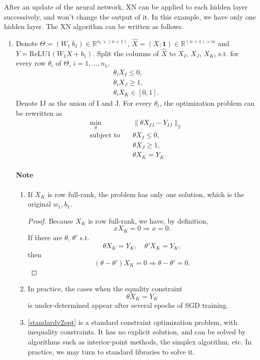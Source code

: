 After an update of the neural network, XN can be applied to each hidden layer successively, and won't change the output of it. In this example, we have only one hidden layer. The XN algorithm can be written as follows.
\begin{enumerate}
	\item Denote $\Theta=(W_1\ b_1)\in\mathbb{R}^{n_1\times(n+1)}$, $\hat X=(X;\mathbf{1})\in\mathbb{R}^{(n+1)\times m}$ and $Y=\text{ReLU1}(W_1X+b_1)$. 
	Split the columns of $\hat X$ to $X_I$, $X_J$, $X_K$, s.t. for every row $\theta_i$ of $\Theta$, $i=1,...,n_1$,
	\begin{equation}
	\begin{aligned}
	\theta_i X_I\leq 0,\\
	\theta_i X_J\geq 1,\\
	\theta_i X_K\in[0,1].
	\end{aligned}
	\end{equation}
	Denote IJ as the union of I and J. For every $\theta_i$, the optimization problem can be rewritten as
	\begin{equation}\label{standardv2opt}
	\begin{aligned}
	\min_\theta&\quad\|\theta  X_{IJ}-Y_{IJ}\|_2\\
	\text{subject to}&\quad\theta X_{I}\leq 0,\\
	&\quad\theta X_{J}\geq 1,\\
	&\quad\theta X_{K}=Y_{K}.
	\end{aligned}
	\end{equation}
	
	\paragraph{Note}
	\begin{enumerate}
	\item
	If $X_K$ is row full-rank, the problem has only one solution, which is the original $w_1,b_1$.
	\begin{proof}
		Because $X_K$ is row full-rank, we have, by definition,
		\begin{equation}
		xX_K=0\Rightarrow x=0.
		\end{equation}
		If there are $\theta$, $\theta'$ s.t.
		\begin{equation}
		\theta X_K=Y_K,\quad \theta' X_K=Y_K,
		\end{equation}
		then
		\begin{equation}
		(\theta-\theta') X_K=0\Rightarrow \theta-\theta'=0.
		\end{equation}
	\end{proof}
	\item
	In practice, the cases when the equality constraint 
	\begin{equation}
		\theta X_K=Y_K
	\end{equation}
    is under-determined	appear after several epochs of SGD training.
	\item
	\ref{standardv2opt} is a standard constraint optimization problem, with inequality constraints. It has no explicit solution, and can be solved by algorithms such as interior-point methods, the simplex algorithm, etc. In practice, we may turn to standard libraries to solve it.


\end{enumerate}
\end{enumerate}
